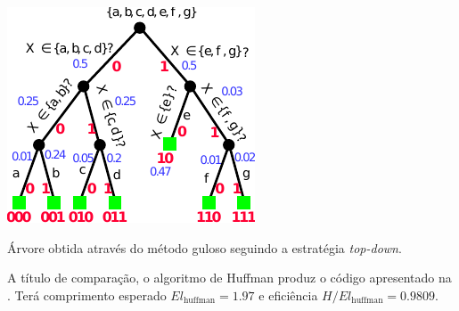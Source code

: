 \begin{example}
  \begin{marginfigure}%
  \centering
  \includegraphics[width=0.9\linewidth]{figures/greedytree.pdf}
  \caption{Árvore obtida através do método guloso seguindo a estratégia \emph{top-down}.}\label{fig:greedytree}
  \end{marginfigure}

  A título de comparação, o algoritmo de Huffman produz o código apresentado na .
  Terá comprimento esperado $E l_{\text{huffman}} = 1.97$ e eficiência $H/E l_{\text{huffman}} = 0.9809$.


\end{example}
